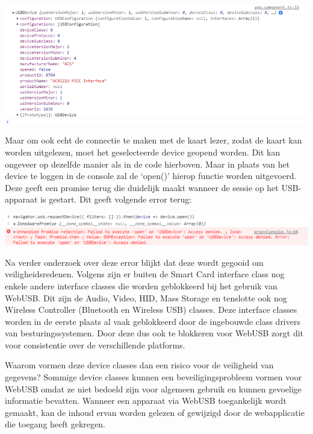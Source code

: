 \begin{center}
    \includegraphics[width=16cm]{device_log}
\end{center}

Maar om ook echt de connectie te maken met de kaart lezer, zodat de kaart kan worden uitgelezen, moet het geselecteerde device geopend worden. Dit kan ongeveer op dezelfde manier als in de code hierboven. Maar in plaats van het device te loggen in de console zal de ‘open()’ hierop functie worden uitgevoerd. Deze geeft een promise terug die duidelijk maakt wanneer de sessie op het USB-apparaat is gestart. Dit geeft volgende error terug: 

\begin{center}
    \includegraphics[width=16cm]{webusb_error}
\end{center}

Na verder onderzoek over deze error blijkt dat deze wordt gegooid om veiligheidsredenen. Volgens \textcite{ReillyGrant} zijn er buiten de Smart Card interface class nog enkele andere interface classes die worden geblokkeerd bij het gebruik van WebUSB. Dit zijn de Audio, Video, HID, Mass Storage en tenslotte ook nog Wireless Controller (Bluetooth en Wireless USB) classes. Deze interface classes worden in de eerste plaats al vaak geblokkeerd door de ingebouwde class drivers van besturingssystemen. Door deze dus ook te blokkeren voor WebUSB zorgt dit voor consistentie over de verschillende platforms. 

Waarom vormen deze device classes dan een risico voor de veiligheid van gegevens? Sommige device classes kunnen een beveiligingsprobleem vormen voor WebUSB omdat ze niet bedoeld zijn voor algemeen gebruik en kunnen gevoelige informatie bevatten. Wanneer een apparaat via WebUSB toegankelijk wordt gemaakt, kan de inhoud ervan worden gelezen of gewijzigd door de webapplicatie die toegang heeft gekregen. 

